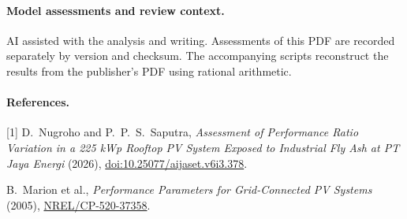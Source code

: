 \documentclass[10pt]{article}
\begin{document}
\paragraph{Model assessments and review context.} AI assisted with the analysis and writing. Assessments of this PDF are recorded separately by version and checksum. The accompanying scripts reconstruct the results from the publisher's PDF using rational arithmetic.
\paragraph{References.}
[1] D.~Nugroho and P.~P.~S.~Saputra, \emph{Assessment of Performance Ratio Variation in a 225 kWp Rooftop PV System Exposed to Industrial Fly Ash at PT Jaya Energi} (2026), \href{https://doi.org/10.25077/aijaset.v6i3.378}{doi:10.25077/aijaset.v6i3.378}.\par
[2] B.~Marion et al., \emph{Performance Parameters for Grid-Connected PV Systems} (2005), \href{https://docs.nrel.gov/docs/fy05osti/37358.pdf}{NREL/CP-520-37358}.
\end{document}
